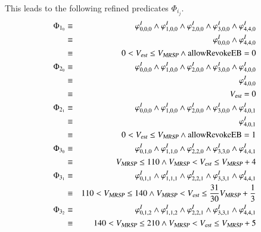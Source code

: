 \begin{example}
This leads to the following refined predicates $\Phi_{i_j}$.
\begin{eqnarray*}
\Phi_{1_0} & \equiv & \varphi_{0,0,0}^I \wedge \varphi_{1,0,0}^I \wedge \varphi_{2,0,0}^I \wedge \varphi_{3,0,0}^I \wedge \varphi_{4,4,0}^I
\\ & \equiv & \varphi_{0,0,0}^I \wedge \varphi_{4,4,0}^I
\\ & \equiv & 0 < \vest \le \vmax \wedge \areb = 0
\\
\Phi_{2_0} & \equiv & \varphi_{0,0,0}^I \wedge \varphi_{1,0,0}^I \wedge \varphi_{2,0,0}^I \wedge \varphi_{3,0,0}^I \wedge \varphi_{4,0,0}^I
\\ & \equiv & \varphi_{4,0,0}^I
\\ & \equiv & \vest = 0 %
\\
\Phi_{2_1} & \equiv & \varphi_{0,0,0}^I \wedge \varphi_{1,0,0}^I \wedge \varphi_{2,0,0}^I \wedge \varphi_{3,0,0}^I \wedge \varphi_{4,0,1}^I
\\ & \equiv & \varphi_{4,0,1}^I
\\ & \equiv & 0 < \vest \le \vmax \wedge \areb = 1
\\
\Phi_{3_0} & \equiv & \varphi_{0,1,0}^I \wedge \varphi_{1,1,0}^I \wedge  \varphi_{2,2,0}^I \wedge \varphi_{3,3,0}^I \wedge \varphi_{4,4,1}^I 
\\ & \equiv &  \vmax \le 110 \wedge   \vmax <  \vest \le \vmax +4  
\\
\Phi_{3_1} & \equiv &  \varphi_{0,1,1}^I \wedge \varphi_{1,1,1}^I \wedge  \varphi_{2,2,1}^I \wedge \varphi_{3,3,1}^I \wedge \varphi_{4,4,1}^I 
\\ & \equiv & 110<\vmax \le 140  \wedge \vmax < \vest \le \frac{31}{30}\vmax +\frac{1}{3}
\\
\Phi_{3_2} & \equiv &  \varphi_{0,1,2}^I \wedge \varphi_{1,1,2}^I \wedge  \varphi_{2,2,1}^I \wedge \varphi_{3,3,1}^I \wedge \varphi_{4,4,1}^I 
\\ & \equiv & 140 < \vmax \le 210 \wedge \vmax <  \vest \le\vmax + 5 
\end{eqnarray*}


\end{example}
